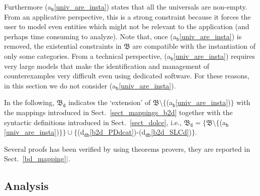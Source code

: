 \documentclass[ao]{iosart2x}
\newcommand{\nb}[1]{\textcolor{red}{$|$}\marginpar{\hspace*{-0cm}\parbox{20mm}{\scriptsize\raggedright\textcolor{red}{#1}}}}
\newcommand{\bfoAxLabel}{\textrm{a$_\texttt{b}$}}
\newcommand{\dbDefLabel}{\textrm{d$_\texttt{db}$}}
\newcommand{\refbfoax}[1]{({\bfoAxLabel}\ref{#1})}
\newcommand{\refdbdf}[1]{({\dbDefLabel}\ref{#1})}
\newcommand{\dolce}{{\textsc{dolce}}}
\newcommand{\bfo}{{\textsc{bfo}}}
\newcommand {\thbfo} {\ensuremath{\mathfrak{B}}}
\newcommand {\dbmap} {\ensuremath{\mathfrak{M}_\texttt{db}}}
\newcommand {\bdmap} {\ensuremath{\mathfrak{M}_\texttt{bd}}}
\newcommand {\thbfobdmap} {\ensuremath{\mathfrak{B}_\texttt{d}}}
\begin{document}
Furthermore \refbfoax{univ_are_insta} states that all the universals are non-empty. From an applicative perspective, this is a strong constraint because it forces the user to model even entities which might not be relevant to the application (and perhaps time consuming to analyze). Note that, once \refbfoax{univ_are_insta} is removed, the existential constraints in $\thbfo$ are compatible with the instantiation of only some categories. From a technical perspective, \refbfoax{univ_are_insta} requires very large models that make the identification and management of counterexamples very difficult even using dedicated software. For these reasons, in this section we do not consider \refbfoax{univ_are_insta}.   

In the following, $\thbfobdmap$ indicates the `extension' of $\thbfo \setminus \{$\refbfoax{univ_are_insta}$\}$ with the mappings introduced in Sect.~\ref{sect_mappings_b2d} together with the syntactic definitions introduced in Sect.~\ref{sect_dolce}, i.e., $\thbfobdmap = \{\thbfo \setminus \{$\refbfoax{univ_are_insta}$\}\} \cup \{$\refdbdf{b2d_PDdcat}-\refdbdf{b2d_SLCd}$\}$.
%
%


Several proofs has been verified by using theorems provers, they are reported in Sect.~\ref{bd_mapping}\nb{FC: frase da modificare}. 
\subsection{Analysis}\label{sect_analysis_b2d}
\end{document}
